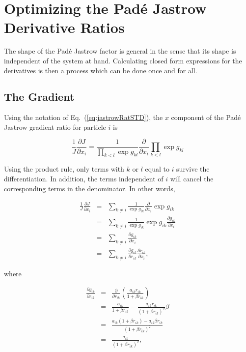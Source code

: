 \section{Optimizing the Padé Jastrow Derivative Ratios}

The shape of the Padé Jastrow factor is general in the sense that its shape is independent of the system at hand. Calculating closed form expressions for the derivatives is then a process which can be done once and for all. 

\subsection{The Gradient}

Using the notation of Eq.~(\ref{eq:jastrowRatSTD}), the $x$ component of the Padé Jastrow gradient ratio for particle $i$ is

\begin{equation}
 \frac{1}{J}\frac{\partial J}{\partial x_i} = \frac{1}{\prod_{k < l}\exp g_{kl}}\frac{\partial }{\partial x_i}\prod_{k < l}\exp g_{kl} 
\end{equation}

Using the product rule, only terms with $k$ or $l$ equal to $i$ survive the differentiation. In addition, the terms independent of $i$ will cancel the corresponding terms in the denominator. In other words, 

\begin{eqnarray}
  \frac{1}{J}\frac{\partial J}{\partial x_i} &=& \sum_{k \ne i} \frac{1}{\exp g_{ik}}\frac{\partial}{\partial x_i} \exp g_{ik} \nonumber\\
  &=& \sum_{k \ne i} \frac{1}{\exp g_{ik}}\exp g_{ik}\frac{\partial g_{ik}}{\partial x_i} \nonumber \\
  &=& \sum_{k \ne i} \frac{\partial g_{ik}}{\partial x_i} \nonumber \\
  &=& \sum_{k \ne i} \frac{\partial g_{ik}}{\partial r_{ik}}\frac{\partial r_{ik}}{\partial x_i},
\end{eqnarray}

where

\begin{eqnarray}
 \frac{\partial g_{ik}}{\partial r_{ik}} &=& \frac{\partial }{\partial r_{ik}} \left(\frac{a_{ik}r_{ik}}{1 + \beta r_{ik}}\right) \nonumber\\
  &=& \frac{a_{ik}}{1 + \beta r_{ik}} - \frac{a_{ik}r_{ik}}{(1 + \beta r_{ik})^2}\beta \nonumber \\
  &=& \frac{a_{ik}(1 + \beta r_{ik}) - a_{ik}\beta r_{ik}}{(1 + \beta r_{ik})^2}  \nonumber \\
  &=& \frac{a_{ik}}{(1 + \beta r_{ik})^2}, \label{eq:jastrowDgikDrik}
\end{eqnarray}


